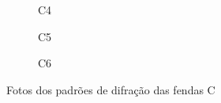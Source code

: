 \begin{figure}[H]
    \centering

    \begin{subfigure}[t]{.6\textwidth}
        \centering
        
        \caption{C4}
        \label{fig:C4}
    \end{subfigure}
    \qquad
    \begin{subfigure}[t]{.6\textwidth}
        \centering
        
        \caption{C5}
        \label{fig:C5}
    \end{subfigure}
    \qquad
    \begin{subfigure}[t]{.6\textwidth}
        \centering
        
        \caption{C6}
        \label{fig:C6}
    \end{subfigure}

    \caption{Fotos dos padrões de difração das fendas C}
    \label{fig:C}
\end{figure}